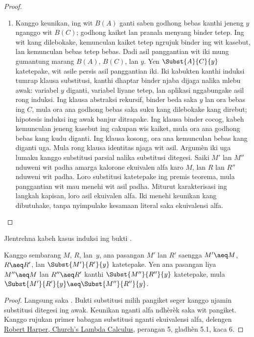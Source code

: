 \documentclass[../../../include/open-logic-section]{subfiles}
\begin{document}
\begin{proof}
\begin{enumerate}
      \item Kanggo keunikan, ing wit $B(A)$ ganti saben godhong bebas kanthi jeneng $y$ nganggo wit $B(C)$; godhong kaiket lan pranala menyang binder tetep. Ing wit kang dilebokake, kemunculan kaiket tetep ngrujuk binder ing wit kasebut, lan kemunculan bebas tetep bebas. Dadi asil panggantian wit iki mung gumantung marang $B(A)$, $B(C)$, lan $y$.
    Yen $\Subst{A}{C}{y}$ katetepake, wit asile persis asil panggantian iki. Iki kabukten kanthi induksi tumrap klausa substitusi, kanthi dhaptar binder njaba dijaga nalika mlebu awak: variabel $y$ diganti, variabel liyane tetep, lan aplikasi nggabungake asil rong induksi. Ing klausa abstraksi rekursif, binder beda saka $y$ lan ora bebas ing $C$, mula ora ana godhong bebas saka suku kang dilebokake kang direbut; hipotesis induksi ing awak banjur ditrapake. Ing klausa binder cocog, kabeh kemunculan jeneng kasebut ing cakupan wis kaiket, mula ora ana godhong bebas kang kudu diganti. Ing klausa kosong, ora ana kemunculan bebas kang diganti uga. Mula rong klausa identitas njaga wit asil. Argumèn iki uga lumaku kanggo substitusi parsial nalika substitusi ditegesi.
    Saiki $M'$ lan $M''$ nduweni wit padha amarga kalorone ekuivalen alfa karo $M$, lan $R$ lan $R''$ nduweni wit padha. Loro substitusi katetepake ing premis teorema, mula panggantian wit mau menehi wit asil padha. Miturut karakterisasi ing langkah kapisan, loro asil ekuivalen alfa. Iki menehi keunikan kang dibutuhake, tanpa nyimpulake kesamaan literal saka ekuivalensi alfa.
  \end{enumerate}
\end{proof}

\begin{prob}
  Jlentrehna kabeh kasus induksi ing bukti .
\end{prob}

\begin{cor}
  Kanggo sembarang $M$, $R$, lan~$y$,
  ana pasangan $M'$ lan $R'$
  saengga $M' \aeq M$, $R \aeq R'$,
  lan $\Subst{M'}{R'}{y}$
  katetepake. Yen ana pasangan liya
  $M'' \aeq M$ lan $R'' \aeq R'$
  kanthi $\Subst{M''}{R''}{y}$
  katetepake, mula
  $\Subst{M'}{R'}{y} \aeq
  \Subst{M''}{R''}{y}$.
\end{cor}

\begin{proof}
  Langsung saka . Bukti substitusi milih pangiket seger kanggo njamin substitusi ditegesi ing awak. Keunikan nganti alfa ndhèrèk saka wit pangiket. Kanggo rujukan primer babagan substitusi nganti ekuivalensi alfa, delengen \href{https://www.cs.cmu.edu/~rwh/pfpl/supplements/ulc.pdf}{Robert Harper, Church's Lambda Calculus}, perangan 5, gladhèn 5.1, kaca 6.
\end{proof}
\end{document}
